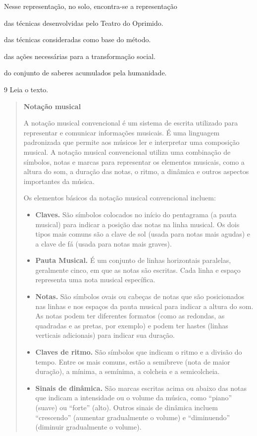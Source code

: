 Nesse representação, no solo, encontra-se a representação

\begin{escolha}
\item
  das técnicas desenvolvidas pelo Teatro do Oprimido.
\item
  das técnicas consideradas como base do método.
\item
  das ações necessárias para a transformação social.
\item
  do conjunto de saberes acumulados pela humanidade.
\end{escolha}


\num{9} Leia o texto.

\begin{quote}
\textbf{Notação musical}

A notação musical convencional é um sistema de escrita utilizado para representar e comunicar informações 
musicais. É uma linguagem padronizada que permite aos músicos ler e interpretar uma composição musical.
A notação musical convencional utiliza uma combinação de símbolos, notas e marcas para representar os 
elementos musicais, como a altura do som, a duração das notas, o ritmo, a dinâmica e outros aspectos 
importantes da música.

Os elementos básicos da notação musical convencional incluem:

\begin{itemize}
  \item \textbf{Claves.} São símbolos colocados no início do pentagrama (a pauta musical) para indicar a 
  posição das notas na linha musical. Os dois tipos mais comuns são a clave de sol (usada para notas mais 
  agudas) e a clave de fá (usada para notas mais graves).
  \item \textbf{Pauta Musical.} É um conjunto de linhas horizontais paralelas, geralmente cinco, em que as 
  notas são escritas. Cada linha e espaço representa uma nota musical específica.
  \item \textbf{Notas.} São símbolos ovais ou cabeças de notas que são posicionados nas linhas e nos 
  espaços da pauta musical para indicar a altura do som. As notas podem ter diferentes formatos (como as 
  redondas, as quadradas e as pretas, por exemplo) e podem ter hastes (linhas verticais adicionais) para indicar sua duração.
  \item \textbf{Claves de ritmo.} São símbolos que indicam o ritmo e a divisão do tempo. Entre os mais 
  comuns, estão a semibreve (nota de maior duração), a mínima, a semínima, a colcheia e a semicolcheia.
  \item \textbf{Sinais de dinâmica.} São marcas escritas acima ou abaixo das notas que indicam a 
  intensidade ou o volume da música, como ``piano'' (suave) ou ``forte'' (alto). Outros sinais de dinâmica 
  incluem ``crescendo'' (aumentar gradualmente o volume) e ``diminuendo'' (diminuir gradualmente o volume).
\end{itemize}


\end{quote}
